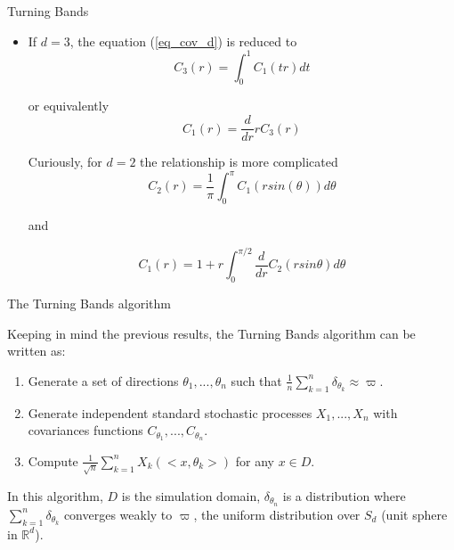 \begin{frame}{Turning Bands}
 \begin{itemize}
  \item If $d=3$, the equation (\ref{eq_cov_d}) is reduced to
  \begin{equation}
    C_3(r) = \int_{0}^{1}C_1(tr)dt
  \end{equation}
  
  or equivalently
  \begin{equation}
   C_1(r) = \frac{d}{dr}rC_3(r)
  \end{equation}

  Curiously, for $d=2$ the relationship is more complicated
  \begin{equation}
   C_2(r) = \frac{1}{\pi}\int_{0}^{\pi}C_1(r sin(\theta))d\theta
  \end{equation}
  
  and
  
  \begin{equation}
   C_1(r) = 1 + r \int_{0}^{\pi/2} \frac{d}{dr}C_2(r sin \theta) d\theta
  \end{equation}


 \end{itemize}

\end{frame}

\begin{frame}{The Turning Bands algorithm} 

 Keeping in mind the previous results, the Turning Bands algorithm can be written as:
 
\begin{block}{}\label{tb.algo}
\begin{enumerate}
 \item Generate a set of directions $\theta_1, ..., \theta_n$ such that $\frac{1}{n}\sum_{k=1}^{n}\delta_{\theta_k} \approx \varpi$.
 \item Generate independent standard stochastic processes $X_1, ..., X_n$ with covariances functions $C_{\theta_1}, ..., C_{\theta_n}$.
 \item Compute $\frac{1}{\sqrt{n}}\sum_{k=1}^{n}X_k(<x, \theta_k>)$ for any $x \in D$.
\end{enumerate}
\end{block} 

In this algorithm, $D$ is the simulation domain, $\delta_{\theta_n}$ is a distribution where $\sum_{k=1}^{n}\delta_{\theta_k}$
converges weakly to $\varpi$, the uniform distribution over $S_d$ (unit sphere in $\mathbb{R}^d$). 
\end{frame}


